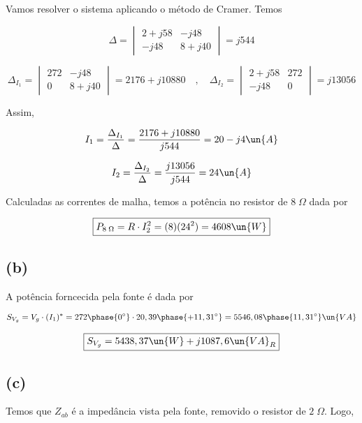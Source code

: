\endgroup

Vamos resolver o sistema aplicando o método de Cramer. Temos

\begingroup
\renewcommand*{\arraystretch}{3}

\[ 
    \Delta
    =
    \begin{vmatrix}
        2 + j58 & -j48    \\
        -j48    & 8 + j40
    \end{vmatrix}
    =
    j544
\]

\[
    \Delta_{I_1}
    =
    \begin{vmatrix}
        272 & -j48    \\
        0    & 8 + j40
    \end{vmatrix}
    =
    2176 + j10880  \quad , \quad 
    \Delta_{I_2}
    =
    \begin{vmatrix}
        2 + j58 & 272    \\
        -j48    & 0
    \end{vmatrix}
    =
    j13056
\]

\endgroup

Assim, 

\[ I_1 = \frac{\Delta_{I_1}}{\Delta} = \frac{2176 + j10880}{j544} = 20 - j4 \un{A} \]

\[ I_2 = \frac{\Delta_{I_2}}{\Delta} = \frac{j13056}{j544} = 24 \un{A} \]

Calculadas as correntes de malha, temos a potência no resistor de $8 \;\Omega$ dada por

\[ \boxed{P_{8 \;\Omega} = R \cdot I_2^2 = (8)(24^2) = 4608 \un{W}}  \]

\subsection*{(b)}

A potência forncecida pela fonte é dada por

\[ S_{V_g} = V_g \cdot (I_1)^* = 272\phase{0^{\circ}} \cdot 20,39\phase{+11,31^{\circ}} = 5546,08\phase{11,31^{\circ}} \un{VA} \]

\[ \boxed{S_{V_g} = 5438,37 \un{W} + j1087,6 \un{VA}_R} \]

\subsection*{(c)}

Temos que $Z_{ab}$ é a impedância vista pela fonte, removido o resistor de $2 \;\Omega$. Logo,


